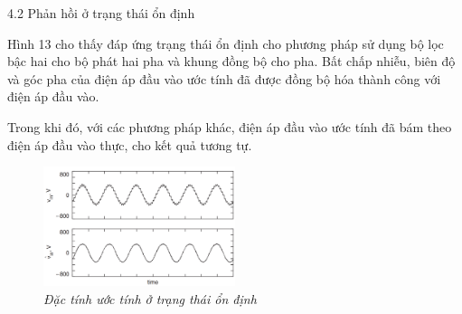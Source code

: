 \documentclass[11pt]{beamer}
\renewcommand{\label}[1]{%
			\gdef\sfname{sf:##1}}%
\begin{document}
\begin{frame}[t]{4.2 Phản hồi ở trạng thái ổn định}
	
	Hình 13 cho thấy đáp ứng trạng thái ổn định cho phương pháp sử dụng bộ lọc bậc hai cho bộ phát hai pha và khung đồng bộ cho pha. 
	Bất chấp nhiễu, biên độ và góc pha của điện áp đầu vào ước tính đã được đồng bộ hóa thành công với điện áp đầu vào.
	 
	Trong khi đó, với các phương pháp khác, điện áp đầu vào ước tính đã bám theo điện áp đầu vào thực, cho kết quả tương tự. 

	\begin{figure}[h]
	\includegraphics[width=0.5\textwidth]{Fig. 13 Estimated characteristics under steady state.PNG}  
	\caption{\textit{Đặc tính ước tính ở trạng thái ổn định}}
	\end{figure}
\end{frame}
\end{document}
